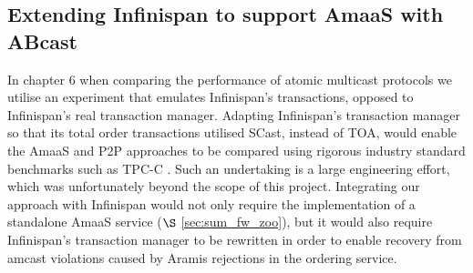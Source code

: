     \subsection{Extending Infinispan to support AmaaS with ABcast}
    In chapter 6 when comparing the performance of atomic multicast protocols we utilise an experiment that emulates Infinispan's transactions, opposed to Infinispan's real transaction manager.   Adapting Infinispan's transaction manager so that its total order transactions utilised \textsf{SCast}, instead of \textsf{TOA}, would enable the \textsf{AmaaS} and P2P approaches to be compared using rigorous industry standard benchmarks such as TPC-C \citep{TPC-C}.  Such an undertaking is a large engineering effort, which was unfortunately beyond the scope of this project.  Integrating our approach with Infinispan would not only require the implementation of a standalone \textsf{AmaaS} service ($\S$ \ref{sec:sum_fw_zoo}), but it would also require Infinispan's transaction manager to be rewritten in order to enable recovery from \textsf{amcast} violations caused by \textsf{Aramis} rejections in the ordering service.  